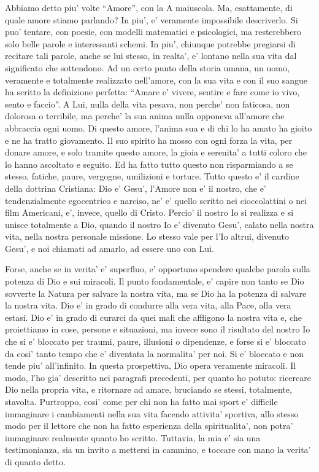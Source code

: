 Abbiamo detto piu' volte ``Amore'', con la A maiuscola. Ma, esattamente, di quale amore stiamo parlando? In piu', e' veramente impossibile descriverlo. Si puo' tentare, con poesie, con modelli matematici e psicologici, ma resterebbero solo belle parole e interessanti schemi. In piu', chiunque potrebbe pregiarsi di recitare tali parole, anche se lui stesso, in realta', e' lontano nella sua vita dal significato che sottendono. Ad un certo punto della storia umana, un uomo, veramente e totalmente realizzato nell'amore, con la sua vita e con il suo sangue ha scritto la definizione perfetta: ``Amare e' vivere, sentire e fare come io vivo, sento e faccio''.
A Lui, nulla della vita pesava, non perche' non faticosa, non dolorosa o terribile,
ma perche' la sua anima nulla opponeva all'amore che abbraccia ogni uomo.
Di questo amore, l'anima sua e di chi lo ha amato ha gioito e ne ha tratto giovamento.
Il suo spirito ha mosso con ogni forza la vita, per donare amore, e solo tramite questo amore,
la gioia e serenita' a tutti coloro che lo hanno ascoltato e seguito.
Ed ha fatto tutto questo non risparmiando a se stesso, fatiche, paure, vergogne, umilizioni e torture.
Tutto questo e' il cardine della dottrina Cristiana: Dio e' Gesu', l'Amore non e' il nostro, che e' tendenzialmente egocentrico e narciso, ne' e' quello scritto nei cioccolattini o nei film Americani, e', invece, quello di Cristo.
Percio' il nostro Io si realizza e si unisce totalmente a Dio, quando il nostro Io e' divenuto Gesu',
calato nella nostra vita, nella nostra personale missione.
Lo stesso vale per l'Io altrui, divenuto Gesu', e noi chiamati ad amarlo, ad essere uno con Lui.

Forse, anche se in verita' e' superfluo, e' opportuno spendere qualche parola sulla potenza di Dio e sui miracoli. Il punto fondamentale, e' capire non tanto se Dio sovverte la Natura per salvare la nostra vita, ma se Dio ha la potenza di salvare la nostra vita. Dio e' in grado di condurre alla vera vita, alla Pace, alla vera estasi. Dio e' in grado di curarci da quei mali che affligono la nostra vita e, che proiettiamo in cose, persone e situazioni, ma invece sono il risultato del nostro Io che si e' bloccato per traumi, paure, illusioni o dipendenze, e forse si e' bloccato da cosi' tanto tempo che e' diventata la normalita' per noi. Si e' bloccato e non tende piu' all'infinito. In questa prospettiva, Dio opera veramente miracoli. Il modo, l'ho gia' descritto nei paragrafi precedenti, per quanto ho potuto: ricercare Dio nella propria vita, e ritornare ad amare, bruciando se stessi, totalmente, stavolta. Purtroppo, cosi' come per chi non ha fatto mai sport e' difficile immaginare i cambiamenti nella sua vita facendo attivita' sportiva, allo stesso modo per il lettore che non ha fatto esperienza della spiritualita', non potra' immaginare realmente quanto ho scritto. Tuttavia, la mia e' sia una testimonianza, sia un invito a mettersi in cammino, e toccare con mano la verita' di quanto detto.

